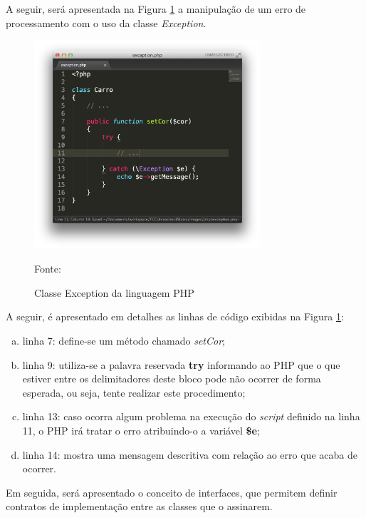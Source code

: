 \FloatBarrier 	%


A seguir, será apresentada na Figura \ref{fig:excecao} a manipulação de um erro de
processamento com o uso da classe \textit{Exception}.

\begin{figure}[h!tb]
	\caption{Classe Exception da linguagem PHP}
	\label{fig:excecao}

	\centering
	\includegraphics[width=0.75\textwidth]{images/exception.png}

	\centering
	\footnotesize Fonte: \fonteOAutor
\end{figure}

\FloatBarrier 	%

A seguir, é apresentado em detalhes as linhas de código exibidas na Figura 
\ref{fig:excecao}:

\begin{enumerate}[a)]
    \item linha 7: define-se um método chamado \textit{setCor};
    \item linha 9: utiliza-se a palavra reservada \textbf{try} informando ao
    \acs{PHP} que o que estiver entre os delimitadores deste bloco pode não
    ocorrer de forma esperada, ou seja, tente realizar este procedimento;
    \item linha 13: caso ocorra algum problema na execução do \textit{script}
    definido na linha 11, o \acs{PHP} irá tratar o erro atribuindo-o a variável
    \textbf{\$e};
    \item linha 14: mostra uma mensagem descritiva com relação ao erro que acaba
    de ocorrer.
\end{enumerate}

Em seguida, será apresentado o conceito de interfaces, que permitem definir
contratos de implementação entre as classes que o assinarem.
